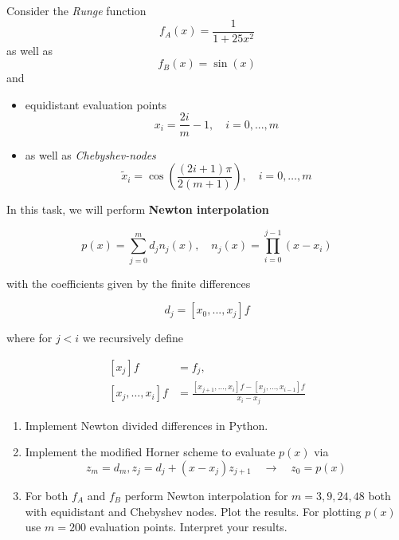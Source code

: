     Consider the \textit{Runge} function
    \begin{equation}
        f_A(x) = \frac{1}{1+25x^2}
    \end{equation}
    as well as
    \begin{equation}
        f_B(x) = \sin(x)
    \end{equation}
    and
    \begin{itemize}
        \item equidistant evaluation points
            \begin{equation}
                x_i = \frac{2i}{m} - 1, \quad i = 0,...,m
            \end{equation}
        \item as well as \textit{Chebyshev-nodes}
            \begin{equation}
                \tilde{x}_i=\cos \left(\frac{(2 i+1) \pi}{2(m+1)}\right), \quad i=0, \ldots, m
            \end{equation}
    \end{itemize}
    In this task, we will perform \textbf{Newton interpolation}

    \begin{equation}
        p(x) = \sum_{j=0}^{m} d_j n_j(x), \quad n_j(x) = \prod_{i = 0}^{j - 1} (x-x_i)
    \end{equation}

    with the coefficients given by the finite differences

    \begin{equation}
        d_j = [x_0,...,x_j] f
    \end{equation}

    where for $j<i$ we recursively define

    \begin{equation}
        \begin{aligned}
            \left[x_j\right]f & = f_j, \\
            \left[x_j, \ldots, x_i\right] f &=\frac{\left[x_{j+1}, \ldots, x_i\right] f-\left[x_j, \ldots, x_{i-1}\right] f}{x_i-x_j}
        \end{aligned}
    \end{equation}

    \begin{enumerate}
        \item Implement Newton divided differences in Python.
        \item Implement the modified Horner scheme to evaluate $p(x)$ via
            \begin{equation}
                z_m = d_m, z_j = d_j + (x - x_j) z_{j+1} \quad \rightarrow \quad z_0 = p(x)
            \end{equation}
        \item For both $f_A$ and $f_B$ perform Newton interpolation for $m = 3, 9, 24, 48$ both
        with equidistant and Chebyshev nodes. Plot the results. For plotting $p(x)$ use
        $m = 200$ evaluation points. Interpret your results.
    \end{enumerate}


\pagebreak